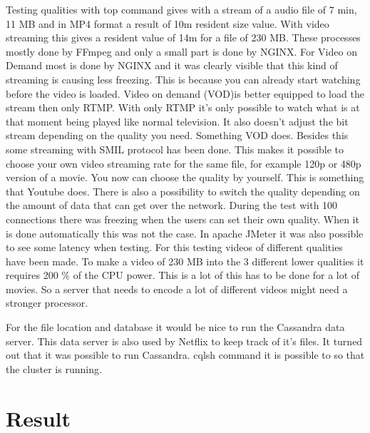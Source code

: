 \documentclass{sig-alternate-br}
\begin{document}
Testing qualities with top command gives with a stream of a audio file of 7 min, 11 MB and in MP4 format a result of 10m resident size value. 
With video streaming this gives a resident value of 14m for a file of 230 MB. These processes mostly done by FFmpeg and only a small part is done by NGINX.  For Video on Demand most is done by NGINX and it was clearly visible that this kind of streaming is causing less freezing. This is because you can already start watching before the video is loaded. Video on demand (VOD)is better equipped to load the stream then only RTMP. With only RTMP it's only possible to watch what is at that moment being played like normal television. It also doesn't adjust the bit stream depending on the quality you need. Something VOD does. \newline
Besides this some streaming with SMIL protocol has been done. This makes it possible to choose your own video streaming rate for the same file, for example 120p or 480p version of a movie. You now can choose the quality by yourself. This is something that Youtube does. There is also a possibility to switch the quality depending on the amount of data that can get over the network. During the test with 100 connections there was freezing when the users can set their own quality. When it is done automatically this was not the case. In apache JMeter it was also possible to see some latency when testing. For this testing videos of different qualities have been made. To make a video of 230 MB into the 3 different lower qualities it requires 200 \% of the CPU power. This is a lot of this has to be done for a lot of movies. So a server that needs to encode a lot of different videos might need a stronger processor. 

For the file location and database it would be nice to run the Cassandra data server. This data server is also used by Netflix to keep track of it's files. It turned out that it was possible to run Cassandra. cqlsh command it is possible to so that the cluster is running.  


\section{Result}
\end{document}
